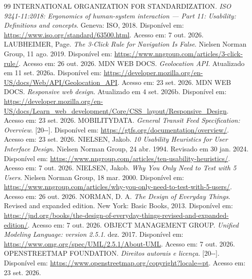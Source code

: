 \documentclass[12pt,oneside,a4paper,brazil,chapter=TITLE]{abntex2}
\begin{document}
\begin{thebibliography}{99}
 INTERNATIONAL ORGANIZATION FOR STANDARDIZATION. \textit{ISO 9241-11:2018: Ergonomics of human-system interaction --- Part 11: Usability: Definitions and concepts}. Geneva: ISO, 2018. Disponível em: \url{https://www.iso.org/standard/63500.html}. Acesso em: 7 out. 2026.
 LAUBHEIMER, Page. \textit{The 3-Click Rule for Navigation Is False}. Nielsen Norman Group, 11 ago. 2019. Disponível em: \url{https://www.nngroup.com/articles/3-click-rule/}. Acesso em: 26 out. 2026.
 MDN WEB DOCS. \textit{Geolocation API}. Atualizado em 11 set. 2026a. Disponível em: \url{https://developer.mozilla.org/en-US/docs/Web/API/Geolocation_API}. Acesso em: 23 set. 2026.
 MDN WEB DOCS. \textit{Responsive web design}. Atualizado em 4 set. 2026b. Disponível em: \url{https://developer.mozilla.org/en-US/docs/Learn_web_development/Core/CSS_layout/Responsive_Design}. Acesso em: 23 set. 2026.
 MOBILITYDATA. \textit{General Transit Feed Specification: Overview}. [20\mbox{-}\mbox{-}]. Disponível em: \url{https://gtfs.org/documentation/overview/}. Acesso em: 23 set. 2026.
 NIELSEN, Jakob. \textit{10 Usability Heuristics for User Interface Design}. Nielsen Norman Group, 24 abr. 1994. Revisado em 30 jan. 2024. Disponível em: \url{https://www.nngroup.com/articles/ten-usability-heuristics/}. Acesso em: 7 out. 2026.
 NIELSEN, Jakob. \textit{Why You Only Need to Test with 5 Users}. Nielsen Norman Group, 18 mar. 2000. Disponível em: \url{https://www.nngroup.com/articles/why-you-only-need-to-test-with-5-users/}. Acesso em: 26 out. 2026.
 NORMAN, D. A. \textit{The Design of Everyday Things}. Revised and expanded edition. New York: Basic Books, 2013. Disponível em: \url{https://jnd.org/books/the-design-of-everyday-things-revised-and-expanded-edition/}. Acesso em: 7 out. 2026.
 OBJECT MANAGEMENT GROUP. \textit{Unified Modeling Language: version 2.5.1}. dez. 2017. Disponível em: \url{https://www.omg.org/spec/UML/2.5.1/About-UML}. Acesso em: 7 out. 2026.
 OPENSTREETMAP FOUNDATION. \textit{Direitos autorais e licença}. [20\mbox{-}\mbox{-}]. Disponível em: \url{https://www.openstreetmap.org/copyright?locale=pt}. Acesso em: 23 set. 2026.

\end{thebibliography}
\end{document}
